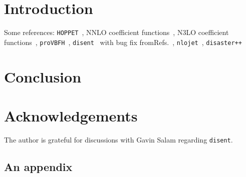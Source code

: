 \documentclass[submission, PhysCodeb]{SciPost}
\newcommand{\hoppet}{{\tt HOPPET}}
\newcommand{\disent}{{\tt disent}}
\newcommand{\provbfh}{{\tt proVBFH}}
\newcommand{\disaster}{{\tt disaster++}}
\newcommand{\nlojet}{{\tt nlojet}}
\begin{document}
\section{Introduction}
\label{sec:intro}
Some references: \hoppet{}~\cite{Salam:2008qg}, NNLO coefficient functions~\cite{vanNeerven:1999ca,vanNeerven:2000uj}, N3LO coefficient functions~\cite{Moch:2004xu,Vermaseren:2005qc,Moch:2008fj,Davies:2016ruz}, \provbfh{}~\cite{Cacciari:2015jma}, \disent{}~\cite{Catani:1996vz} with bug fix fromRefs.~\cite{Borsa:2020ulb,Borsa:2020yxh}, \nlojet{}~\cite{Nagy:2001xb}, \disaster{}~\cite{Graudenz:1997gv}


\section{Conclusion}
\label{sec:conclusion}

\section*{Acknowledgements}
The author is grateful for discussions with Gavin Salam regarding {\tt disent}. 


\begin{appendix}

  \section{An appendix}

\end{appendix}



\nolinenumbers
\end{document}
